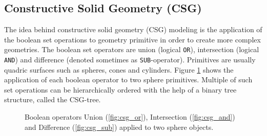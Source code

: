 \subsection{Constructive Solid Geometry (CSG)}

The idea behind constructive solid geometry (CSG) modeling is the application of the boolean set operations to geometry primitive in order to create more complex geometries. The boolean set operators are union (logical \texttt{OR}), intersection (logical \texttt{AND}) and difference (denoted sometimes as \texttt{SUB}-operator). 
Primitives are usually quadric surfaces such as spheres, cones and cylinders. Figure \ref{fig:csg} shows the application of each boolean operator to two sphere primitives. Multiple of such set operations can be hierarchically ordered with the help of a binary tree structure, called the CSG-tree.   

\begin{figure} 
	\centering
	\hfill
	\hfill
	\caption{Boolean operators Union (\ref{fig:csg_or}), Intersection (\ref{fig:csg_and}) and Difference (\ref{fig:csg_sub}) applied to two sphere objects.}
	\label{fig:csg}
\end{figure}

